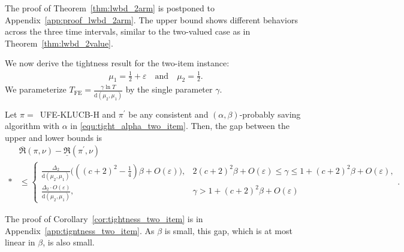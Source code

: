 \documentclass[twoside,11pt]{article}
\newcommand{\rmd}{\mathrm{d}}
\newcommand{\Tfe}{T_{\mathrm{FE}}}
\newcommand{\ouralg}{\textsc{UFE-KLUCB-H}}
\begin{document}
The proof of Theorem~\ref{thm:lwbd_2arm} is postponed to Appendix~\ref{app:proof_lwbd_2arm}.
The upper bound shows different  behaviors across the three time intervals, similar to the two-valued case as in Theorem~\ref{thm:lwbd_2value}.

We now derive the tightness result for the two-item instance:
\begin{align}
    \mu_1 = \frac{1}{2}+\varepsilon 
    \quad\mbox{and}\quad
    \mu_2 = \frac{1}{2}.
\end{align}
We parameterize $\Tfe = \frac{\gamma\ln T}{\rmd(\mu_2,\mu_1)}$ by the single parameter $\gamma$.
\begin{corollary}\label{cor:tightness_two_item}
    Let $\pi=$\ \ouralg{} and $\pi^\prime$ be any consistent and $(\alpha,\beta)$-probably saving algorithm with $\alpha$  in \eqref{equ:tight_alpha_two_item}. Then, the gap between the upper and lower bounds is
   \begin{align}
        &\overline{\mathfrak{R}}(\pi,\nu)- \underline{\mathfrak{R}}(\pi^\prime,\nu)
        \\*
        &
        \le\left\{\! \begin{array}{cc}
               \frac{\Delta_{2}}{\rmd(\mu_2,\mu_1)}\big(((c+2)^2-\frac{1}{4})\beta+O(\varepsilon)\big),& 2 (c+2)^2\beta + O(\varepsilon) \leq \gamma \leq
            1 + (c+2)^2\beta + O(\varepsilon),\\
                 \frac{\Delta_2\cdot O(\varepsilon)}{\rmd(\mu_2,\mu_1)}, & \gamma> 1 + (c+2)^2\beta + O(\varepsilon)
        \end{array}  \right. .
    \end{align}
\end{corollary}
The proof of Corollary~\ref{cor:tightness_two_item} is in Appendix~\ref{app:tigntness_two_item}.
As $\beta$ is small, this gap, which is at most linear in $\beta$, is  also  small.
\end{document}
